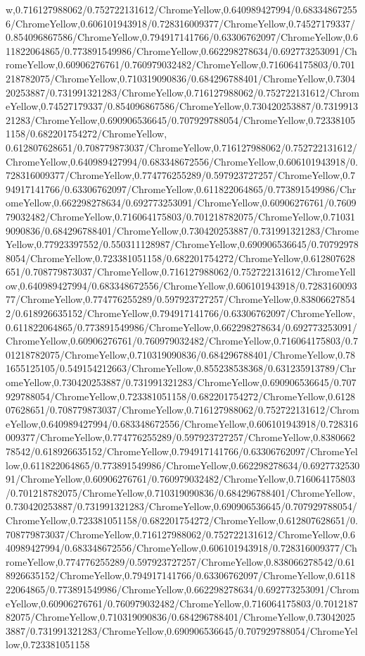 {\begin{tikzternal}
{w,0.716127988062/0.752722131612/ChromeYellow,0.640989427994/0.683348672556/ChromeYellow,0.606101943918/0.728316009377/ChromeYellow,0.74527179337/0.854096867586/ChromeYellow,0.794917141766/0.63306762097/ChromeYellow,0.611822064865/0.773891549986/ChromeYellow,0.662298278634/0.692773253091/ChromeYellow,0.60906276761/0.760979032482/ChromeYellow,0.716064175803/0.701218782075/ChromeYellow,0.710319090836/0.684296788401/ChromeYellow,0.730420253887/0.731991321283/ChromeYellow,0.716127988062/0.752722131612/ChromeYellow,0.74527179337/0.854096867586/ChromeYellow,0.730420253887/0.731991321283/ChromeYellow,0.690906536645/0.707929788054/ChromeYellow,0.723381051158/0.682201754272/ChromeYellow,
0.612807628651/0.708779873037/ChromeYellow,0.716127988062/0.752722131612/ChromeYellow,0.640989427994/0.683348672556/ChromeYellow,0.606101943918/0.728316009377/ChromeYellow,0.774776255289/0.597923727257/ChromeYellow,0.794917141766/0.63306762097/ChromeYellow,0.611822064865/0.773891549986/ChromeYellow,0.662298278634/0.692773253091/ChromeYellow,0.60906276761/0.760979032482/ChromeYellow,0.716064175803/0.701218782075/ChromeYellow,0.710319090836/0.684296788401/ChromeYellow,0.730420253887/0.731991321283/ChromeYellow,0.77923397552/0.550311128987/ChromeYellow,0.690906536645/0.707929788054/ChromeYellow,0.723381051158/0.682201754272/ChromeYellow,0.612807628651/0.708779873037/ChromeYellow,0.716127988062/0.752722131612/ChromeYellow,0.640989427994/0.683348672556/ChromeYellow,0.606101943918/0.728316009377/ChromeYellow,0.774776255289/0.597923727257/ChromeYellow,0.838066278542/0.618926635152/ChromeYellow,0.794917141766/0.63306762097/ChromeYellow,0.611822064865/0.773891549986/ChromeYellow,0.662298278634/0.692773253091/ChromeYellow,0.60906276761/0.760979032482/ChromeYellow,0.716064175803/0.701218782075/ChromeYellow,0.710319090836/0.684296788401/ChromeYellow,0.781655125105/0.549154212663/ChromeYellow,0.855238538368/0.631235913789/ChromeYellow,0.730420253887/0.731991321283/ChromeYellow,0.690906536645/0.707929788054/ChromeYellow,0.723381051158/0.682201754272/ChromeYellow,0.612807628651/0.708779873037/ChromeYellow,0.716127988062/0.752722131612/ChromeYellow,0.640989427994/0.683348672556/ChromeYellow,0.606101943918/0.728316009377/ChromeYellow,0.774776255289/0.597923727257/ChromeYellow,0.838066278542/0.618926635152/ChromeYellow,0.794917141766/0.63306762097/ChromeYellow,0.611822064865/0.773891549986/ChromeYellow,0.662298278634/0.692773253091/ChromeYellow,0.60906276761/0.760979032482/ChromeYellow,0.716064175803/0.701218782075/ChromeYellow,0.710319090836/0.684296788401/ChromeYellow,0.730420253887/0.731991321283/ChromeYellow,0.690906536645/0.707929788054/ChromeYellow,0.723381051158/0.682201754272/ChromeYellow,0.612807628651/0.708779873037/ChromeYellow,0.716127988062/0.752722131612/ChromeYellow,0.640989427994/0.683348672556/ChromeYellow,0.606101943918/0.728316009377/ChromeYellow,0.774776255289/0.597923727257/ChromeYellow,0.838066278542/0.618926635152/ChromeYellow,0.794917141766/0.63306762097/ChromeYellow,0.611822064865/0.773891549986/ChromeYellow,0.662298278634/0.692773253091/ChromeYellow,0.60906276761/0.760979032482/ChromeYellow,0.716064175803/0.701218782075/ChromeYellow,0.710319090836/0.684296788401/ChromeYellow,0.730420253887/0.731991321283/ChromeYellow,0.690906536645/0.707929788054/ChromeYellow,0.723381051158}
\end{tikzternal}}
